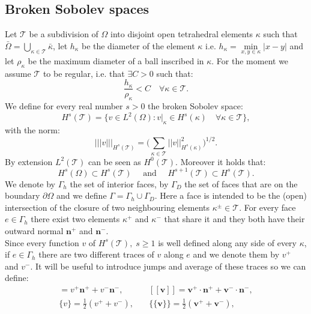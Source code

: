 \documentclass[12pt, a4paper]{article}
\theoremstyle{definition}
\theoremstyle{plain}
\theoremstyle{plain}
\theoremstyle{definition}
\begin{document}
\subsection{Broken Sobolev spaces}
Let $\mathcal{T}$ be a subdivision of $\Omega$ into disjoint open tetrahedral elements $\kappa$ such that $\bar{\Omega} = \bigcup\limits_{\kappa \in \mathcal{T}} \bar{\kappa}$, let $h_\kappa$ be the diameter of the element $\kappa$ i.e. $h_\kappa = \min\limits_{x, y \in \kappa} |x-y|$ and let $\rho_\kappa$ be the maximum diameter of a ball inscribed in $\kappa$. For the moment we assume $\mathcal{T}$ to be regular, i.e. that $\exists C > 0$ such that:
\begin{equation*}
	\frac{h_\kappa}{\rho_\kappa} < C \quad \forall \kappa \in \mathcal{T}.
\end{equation*}
We define for every real number $s>0$ the broken Sobolev space:
\begin{equation*}
	H^s(\mathcal{T}) = \{ v \in L^2(\Omega) : v|_\kappa \in H^s(\kappa) \quad 
	\forall \kappa \in \mathcal{T} \},
\end{equation*}
with the norm:
\begin{equation*}
	|\!|\!|v|\!|\!|_{H^s(\mathcal{T})} = \bigg( \sum_{\kappa \in \mathcal{T}} |\!|v|\!|_{H^s(\kappa)}^2 \bigg)^{1/2}.
\end{equation*}
By extension $L^2(\mathcal{T})$ can be seen as $H^0(\mathcal{T})$. Moreover it holds that:
\begin{equation*}
	H^s(\Omega) \subset H^s(\mathcal{T}) \quad \text{ and } \quad 
	H^{s+1}(\mathcal{T}) \subset H^s(\mathcal{T}).
\end{equation*}
We denote by $\Gamma_h$ the set of interior faces, by $\Gamma_D$ the set of 
faces that are on the boundary $\partial \Omega$ and we define $\Gamma = 
\Gamma_h \cup \Gamma_D$. Here a face is intended to be the (open) intersection 
of the closure of two neighbouring elements $\kappa^\pm \in \mathcal{T}$. For 
every face $e \in \Gamma_h$ there exist two elements 
$\kappa^+$ and $\kappa^-$ that share it and they both have their outward normal 
$\mathbf{n}^+$ and $\mathbf{n}^-$.\\
Since every function $v$ of $H^s(\mathcal{T}), \; s \geq 1$ is well defined 
along any side of every $\kappa$, if $e \in \Gamma_h$ there are two different 
traces of $v$ along $e$ and we denote them by $v^+$ and $v^-$.
It will be useful to introduce jumps and average of these traces so we can 
define:
\begin{align}
	[v] = v^+ \mathbf{n}^+ + v^- \mathbf{n}^-,
	&\quad [\![ \mathbf{v} ]\!] = \mathbf{v}^+ \cdot \mathbf{n}^+ + \mathbf{v}^- \cdot \mathbf{n}^-, \label{eq:jump} \\
	\{v\} = \frac{1}{2} (v^+ + v^-) ,
	& \quad \{\!\!\{ \mathbf{v} \}\!\!\} = \frac{1}{2} (\mathbf{v}^+ +\mathbf{v}^-), \label{eq:aver}
\end{align}
\end{document}
